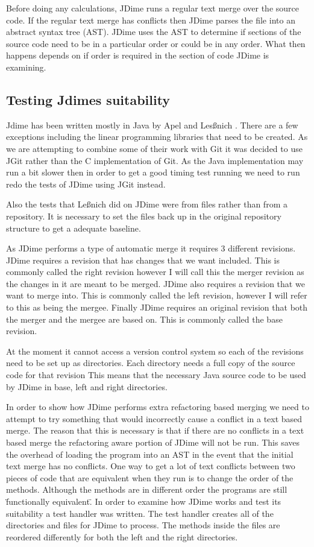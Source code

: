 Before doing any calculations, JDime runs a regular text merge over the source code.  
If the regular text merge has conflicts then JDime parses the file into an abstract syntax tree (AST).  JDime uses the AST to determine if sections of the source code need to be in a particular order or could be in any order.
What then happens depends on if order is required in the section of code JDime is examining.

\subsection{Testing Jdimes suitability}

Jdime has been written mostly in Java by Apel and Les{\ss}nich \cite{Apel2012} .  There are a few exceptions including the linear programming libraries that need to be created.  As we are attempting to combine some of their work with Git it was decided to use JGit rather than the C implementation of Git. As the Java implementation may run a bit slower then in order to get a good timing test running we need to run redo the tests of JDime using JGit instead. 

Also the tests that Le{\ss}nich did on JDime were from files rather than from a repository. It is necessary to set the files back up in the original repository structure to get a adequate baseline.

As JDime performs a type of automatic merge it requires 3 different revisions.
JDime requires a revision that has changes that we want included.  This is commonly called the right revision however I will call this the merger revision as the changes in it are meant to be merged.
JDime also requires a revision that we want to merge into.  This is commonly called the left revision, however I will refer to this as being the mergee. 
Finally JDime requires an original revision that both the merger and the mergee are based on.
This is commonly called the base revision.

At the moment it cannot access a version control system so each of the revisions need to be set up as directories.
Each directory needs a full copy of the source code for that revision 
This means that the necessary Java source code to be used by JDime in base, left and right directories.


In order to show how JDime performs extra refactoring based merging we need to attempt to try something that would incorrectly cause a conflict in a text based merge.  The reason that this is necessary is that if there are no conflicts in a text based merge the refactoring aware portion of JDime will not be run.  This saves the overhead of loading the program into an AST in the event that the initial text merge has no conflicts. 
One way to get a lot of text conflicts between two pieces of code that are equivalent when they run is to change the order of the methods.
Although the methods are in different order the programs are still \"functionally equivalent\".
In order to examine how JDime works and test its suitability a test handler was written.
The test handler creates all of the directories and files for JDime to process.
The methods inside the files are reordered differently for both the left and the right directories.


